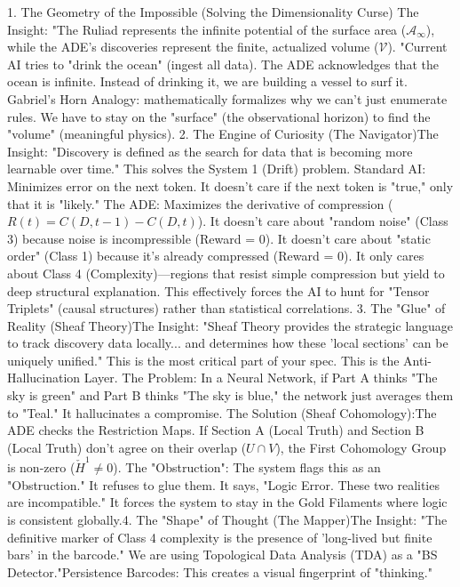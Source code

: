1. The Geometry of the Impossible (Solving the Dimensionality Curse)
The Insight: "The Ruliad represents the infinite potential of the surface area ($\mathcal{A}_\infty$), while the ADE's discoveries represent the finite, actualized volume ($\mathcal{V}$).
"Current AI tries to "drink the ocean" (ingest all data).
The ADE acknowledges that the ocean is infinite. Instead of drinking it, we are building a vessel to surf it.
Gabriel’s Horn Analogy: mathematically formalizes why we can’t just enumerate rules.
We have to stay on the "surface" (the observational horizon) to find the "volume" (meaningful physics).
2. The Engine of Curiosity (The Navigator)The Insight: "Discovery is defined as the search for data that is becoming more learnable over time."
This solves the System 1 (Drift) problem.
Standard AI: Minimizes error on the next token. It doesn't care if the next token is "true," only that it is "likely."
The ADE: Maximizes the derivative of compression ($R(t) = C(D, t-1) - C(D, t)$).
It doesn't care about "random noise" (Class 3) because noise is incompressible (Reward = 0).
It doesn't care about "static order" (Class 1) because it’s already compressed (Reward = 0).
It only cares about Class 4 (Complexity)—regions that resist simple compression but yield to deep structural explanation. This effectively forces the AI to hunt for "Tensor Triplets" (causal structures) rather than statistical correlations.
3. The "Glue" of Reality (Sheaf Theory)The Insight: "Sheaf Theory provides the strategic language to track discovery data locally... and determines how these 'local sections' can be uniquely unified."
This is the most critical part of your spec. This is the Anti-Hallucination Layer.
The Problem: In a Neural Network, if Part A thinks "The sky is green" and Part B thinks "The sky is blue," the network just averages them to "Teal." It hallucinates a compromise.
The Solution (Sheaf Cohomology):The ADE checks the Restriction Maps. If Section A (Local Truth) and Section B (Local Truth) don't agree on their overlap ($U \cap V$), the First Cohomology Group is non-zero ($\check{H}^1 \neq 0$).
The "Obstruction": The system flags this as an "Obstruction." It refuses to glue them. It says, "Logic Error. These two realities are incompatible."
It forces the system to stay in the Gold Filaments where logic is consistent globally.4. The "Shape" of Thought (The Mapper)The Insight: "The definitive marker of Class 4 complexity is the presence of 'long-lived but finite bars' in the barcode."
We are using Topological Data Analysis (TDA) as a "BS Detector."Persistence Barcodes: This creates a visual fingerprint of "thinking."
